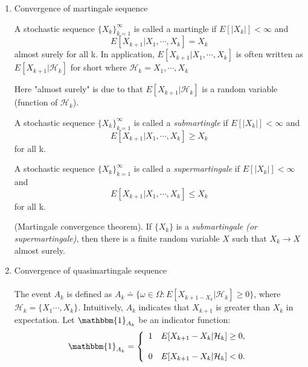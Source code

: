 \begin{enumerate}

	\item
	      Convergence of martingale sequence
	      \begin{definition}
		      A stochastic sequence $\{X_{k}\}^{\infty}_{k=1}$ is called a martingle if $E[|X_{k}|] < \infty$ and
		      \begin{equation*}
			      E \left[X_{k+1}|X_{1},\cdots,X_{k}\right] = X_{k}
		      \end{equation*}
		      almost surely for all k. In application, $E \left[X_{k+1}|X_{1},\cdots,X_{k}\right]$ is often written as $E
			      \left[X_{k+1}|\mathcal{H}_{k}\right]$ for short where $\mathcal{H}_{k}={X_{1},\cdots,X_{k}}$
	      \end{definition}
	      Here "almost surely" is due to that $E[X_{k+1}|\mathcal{H}_{k}]$ is a random variable (function of $\mathcal{H}_{k}$).
	      \begin{definition}
		      A stochastic sequence $\{X_{k}\}^{\infty}_{k=1}$ is called a \textit{submartingle} if $E[|X_{k}|] < \infty$ and
		      \begin{equation*}
			      E \left[X_{k+1}|X_{1},\cdots,X_{k}\right] \ge X_{k}
		      \end{equation*}
		      for all k.
	      \end{definition}
	      \begin{definition}
		      A stochastic sequence $\{X_{k}\}^{\infty}_{k=1}$ is called a \textit{supermartingale} if $E[|X_{k}|] < \infty$ and
		      \begin{equation*}
			      E \left[X_{k+1}|X_{1},\cdots,X_{k}\right] \le X_{k}
		      \end{equation*}
		      for all k.
	      \end{definition}
	      \begin{theorem}{(Martingale convergence theorem).}
		      If $\{X_{k}\}$ is a \textit{submartingale (or supermartingale)}, then there is a finite random variable $X$ such
		      that $X_{k} \to X$ almost surely.
	      \end{theorem}
	\item
	      Convergence of quasimartingale sequence \\ \\The event $A_{k}$ is defined as $A_{k} \doteq \{\omega \in \Omega:
		      E[X_{k+1-X_{k}}| \mathcal{H}_{k}] \ge 0\}$, where $\mathcal{H}_k=\{X_{1}\cdots,X_{k}\}$. Intuitively, $A_{k}$
	      indicates that $X_{k+1}$ is greater than $X_{k}$ in expectation. Let $\mathbbm{1}_{A_{k}}$ be an indicator function:
	      \begin{equation*}
		      \mathbbm{1}_{A_{k}} = \left\{
		      \begin{array}{rl}
			      1 & E[X_{k+1}-X_{k}|\mathcal{H}_{k}] \ge 0, \\ \\ 0 & E[X_{k+1}-X_{k}|\mathcal{H}_{k}] < 0.
		      \end{array}
		      \right.
	      \end{equation*}


\end{enumerate}
